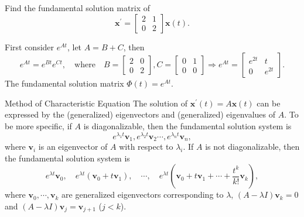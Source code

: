 \begin{example}{}{}
  Find the fundamental solution matrix of
  \begin{equation}
    \mathbf{x}^{\prime} =
    \begin{bmatrix}
      2 & 1\\
      0 & 2
    \end{bmatrix} \mathbf{x}(t).
  \end{equation}
\end{example}

\begin{solution}
  First consider $e^{At}$, let $A = B + C$, then
  \begin{equation}
    e^{At} = e^{Bt}e^{Ct}, \quad
    \text{where} \quad
    B =
    \begin{bmatrix}
      2 & 0\\
      0 & 2
    \end{bmatrix}, C =
    \begin{bmatrix}
      0 & 1\\
      0 & 0
    \end{bmatrix}
    \Rightarrow e^{At} =
    \begin{bmatrix}
      e^{2t} & t\\
      0 & e^{2t}
    \end{bmatrix}.
  \end{equation}
  The fundamental solution matrix $\Phi(t) = e^{At}$.
\end{solution}

\begin{proposition}{Method of Characteristic Equation}{}
  The solution of $\mathbf{x}^{\prime}(t) = A \mathbf{x}(t)$ can be expressed
  by the (generalized) eigenvectors and (generalized) eigenvalues of $A$.
  To be more specific, if $A$ is diagonalizable, then the fundamental solution system is
  \begin{equation}
    e^{\lambda_1 t}\mathbf{v}_1, e^{\lambda_2 t}\mathbf{v}_2 \cdots, e^{\lambda_n t}\mathbf{v}_n,
  \end{equation}
  where $\mathbf{v}_i$ is an eigenvector of $A$ with respect to $\lambda_i$.
  If $A$ is not diagonalizable, then the fundamental solution system is
  \begin{equation}
    e^{\lambda t} \mathbf{v}_0, \quad
    e^{\lambda t} \left( \mathbf{v}_0 + t\mathbf{v}_1 \right), \quad \cdots, \quad
    e^{\lambda t} \left( \mathbf{v}_0 + t\mathbf{v}_1 + \cdots + \frac{t^k}{k!}\mathbf{v}_k \right),
  \end{equation}
  where $\mathbf{v}_0, \cdots, \mathbf{v}_k$ are generalized eigenvectors corresponding to $\lambda$,
  $(A - \lambda I) \mathbf{v}_k = 0$ and $(A - \lambda I)\mathbf{v}_j = \mathbf{v}_{j+1}$ ($j < k$).
\end{proposition}

